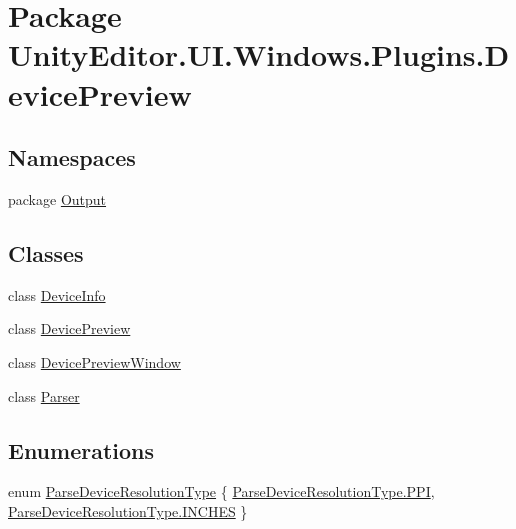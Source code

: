 \hypertarget{namespace_unity_editor_1_1_u_i_1_1_windows_1_1_plugins_1_1_device_preview}{}\section{Package Unity\+Editor.\+U\+I.\+Windows.\+Plugins.\+Device\+Preview}
\label{namespace_unity_editor_1_1_u_i_1_1_windows_1_1_plugins_1_1_device_preview}
\subsection*{Namespaces}
\begin{DoxyCompactItemize}
\item 
package \hyperlink{namespace_unity_editor_1_1_u_i_1_1_windows_1_1_plugins_1_1_device_preview_1_1_output}{Output}
\end{DoxyCompactItemize}
\subsection*{Classes}
\begin{DoxyCompactItemize}
\item 
class \hyperlink{class_unity_editor_1_1_u_i_1_1_windows_1_1_plugins_1_1_device_preview_1_1_device_info}{Device\+Info}
\item 
class \hyperlink{class_unity_editor_1_1_u_i_1_1_windows_1_1_plugins_1_1_device_preview_1_1_device_preview}{Device\+Preview}
\item 
class \hyperlink{class_unity_editor_1_1_u_i_1_1_windows_1_1_plugins_1_1_device_preview_1_1_device_preview_window}{Device\+Preview\+Window}
\item 
class \hyperlink{class_unity_editor_1_1_u_i_1_1_windows_1_1_plugins_1_1_device_preview_1_1_parser}{Parser}
\end{DoxyCompactItemize}
\subsection*{Enumerations}
\begin{DoxyCompactItemize}
\item 
enum \hyperlink{namespace_unity_editor_1_1_u_i_1_1_windows_1_1_plugins_1_1_device_preview_a8e3e0efed929bd827531e483e24ae97f}{Parse\+Device\+Resolution\+Type} \{ \hyperlink{namespace_unity_editor_1_1_u_i_1_1_windows_1_1_plugins_1_1_device_preview_a8e3e0efed929bd827531e483e24ae97fada388f5a4dd69f102143b581d2b1b4d8}{Parse\+Device\+Resolution\+Type.\+P\+P\+I}, 
\hyperlink{namespace_unity_editor_1_1_u_i_1_1_windows_1_1_plugins_1_1_device_preview_a8e3e0efed929bd827531e483e24ae97fa37df90b036766d2a43a1e4d2491927ee}{Parse\+Device\+Resolution\+Type.\+I\+N\+C\+H\+E\+S}
 \}
\end{DoxyCompactItemize}


